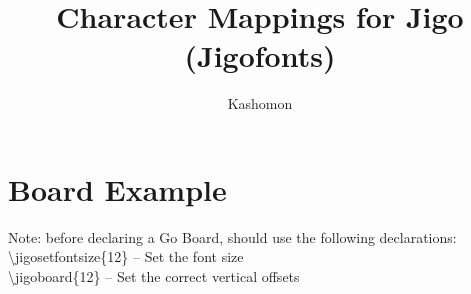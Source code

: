 \documentclass{article}
\begin{document}
\title{Character Mappings for Jigo (Jigofonts)}
\author{Kashomon}
\maketitle

\newcommand{\tbs}{\textbackslash}

\section{Board Example}

Note: before declaring a Go Board, should use the following declarations:\\
\tbs{}jigosetfontsize\{12\} -- Set the font size \\
\tbs{}jigoboard\{12\} -- Set the correct vertical offsets \\
\end{document}
